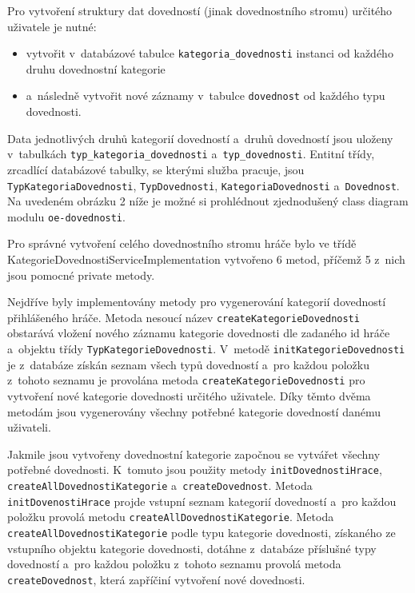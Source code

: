 \documentclass[12pt]{article}
\begin{document}
{Pro vytvoření struktury dat dovedností (jinak dovednostního stromu) určitého uživatele je nutné:

\begin{itemize}

\item vytvořit v~databázové tabulce \texttt{kategoria\_dovednosti} instanci od každého druhu dovednostní kategorie
\item  a~následně vytvořit nové záznamy v~tabulce \texttt{dovednost} od každého typu dovednosti.
\end{itemize}

Data jednotlivých druhů kategorií dovedností a~druhů dovedností jsou uloženy v~tabulkách \texttt{typ\_kategoria\_dovednosti} a~\texttt{typ\_dovednosti}.
Entitní třídy, zrcadlící databázové tabulky, se kterými služba pracuje,
jsou \texttt{TypKategoriaDovednosti}, \texttt{TypDovednosti}, \texttt{KategoriaDovednosti} a~\texttt{Dovednost}.
Na uvedeném obrázku 2 níže je možné si prohlédnout zjednodušený class diagram modulu \texttt{oe-dovednosti}.

\clearpage

\obrazek
{}

Pro správné vytvoření celého dovednostního stromu hráče bylo ve třídě KategorieDovednostiServiceImplementation vytvořeno 6 metod, příčemž 5 z~nich jsou pomocné private metody.

Nejdříve byly implementovány metody pro vygenerování kategorií dovedností přihlášeného hráče. Metoda nesoucí název \texttt{createKategorieDovednosti} obstarává vložení nového záznamu kategorie dovednosti dle zadaného id hráče a~objektu třídy \texttt{TypKategorieDovednosti}.
V~metodě \texttt{initKategorieDovednosti} je z~databáze získán seznam všech typů dovedností a~pro každou položku z~tohoto seznamu je provolána metoda \texttt{createKategorieDovednosti} pro vytvoření nové kategorie dovednosti určitého uživatele. Díky těmto dvěma metodám jsou vygenerovány všechny potřebné kategorie dovedností danému uživateli. 

Jakmile jsou vytvořeny dovednostní kategorie započnou se vytvářet všechny potřebné dovednosti. K~tomuto jsou použity metody \texttt{initDovednostiHrace}, \texttt{createAllDovednostiKategorie} a~\texttt{createDovednost}. Metoda \texttt{initDovenostiHrace} projde vstupní seznam kategorií dovedností a~pro každou položku provolá metodu \texttt{createAllDovednostiKategorie}. Metoda \texttt{createAllDovednostiKategorie}  podle typu kategorie dovednosti, získaného ze vstupního objektu kategorie dovednosti, dotáhne z~databáze příslušné typy dovedností a~pro každou položku z~tohoto seznamu provolá metoda \texttt{createDovednost}, která zapříčiní vytvoření nové dovednosti. 

}
\end{document}
